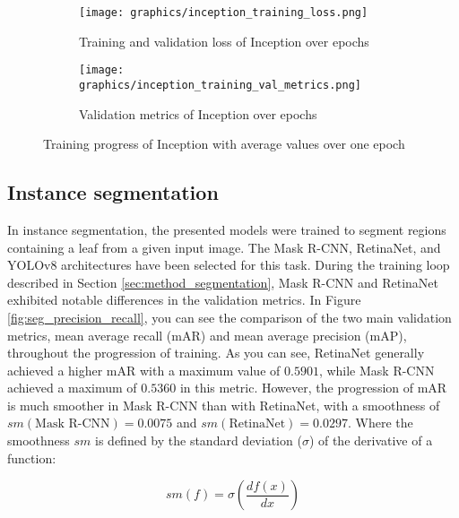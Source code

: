 \documentclass[draft,final]{vutinfth} %
\begin{document}
\begin{appendix}
\begin{figure}
    \centering
    \begin{subfigure}{0.48\textwidth}
        \texttt{[image: graphics/inception\_training\_loss.png]}
        \caption{Training and validation loss of Inception over epochs}
        \label{fig:inception_training_loss}
    \end{subfigure}
    \begin{subfigure}{0.48\textwidth}
        \centering
        \texttt{[image: graphics/inception\_training\_val\_metrics.png]}
        \caption{Validation metrics of Inception over epochs \newline}
        \label{fig:inception_training_val_metrics}
        
    \end{subfigure}
    \caption{Training progress of Inception with average values over one epoch}
    \label{fig:inception_training}
\end{figure}

\subsection{Instance segmentation} \label{sec:leaf_segmentation_instance_training}

In instance segmentation, the presented models were trained to segment regions containing a leaf from a given input image. The Mask R-CNN, RetinaNet, and YOLOv8 architectures have been selected for this task.
During the training loop described in Section \ref{sec:method_segmentation}, Mask R-CNN and RetinaNet exhibited notable differences in the validation metrics.
In Figure \ref{fig:seg_precision_recall}, you can see the comparison of the two main validation metrics, mean average recall (mAR) and mean average precision (mAP), throughout the progression of training. As you can see, RetinaNet generally achieved a higher mAR with a maximum value of $0.5901$, while Mask R-CNN achieved a maximum of $0.5360$ in this metric. However, the progression of mAR is much smoother in Mask R-CNN than with RetinaNet, with a smoothness of $sm(\text{Mask R-CNN}) = 0.0075$ and $sm(\text{RetinaNet}) = 0.0297$. Where the smoothness $sm$ is defined by the standard deviation ($\sigma$) of the derivative of a function:

\begin{equation} \label{eqn:smoothness}
    sm(f) = \sigma(\frac{df(x)}{dx})
\end{equation}


\end{appendix}
\end{document}
